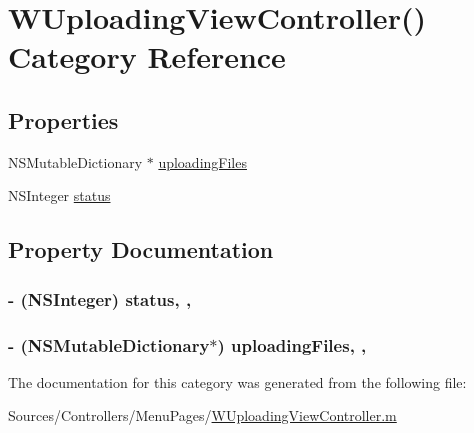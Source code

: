 \hypertarget{category_w_uploading_view_controller_07_08}{\section{W\-Uploading\-View\-Controller() Category Reference}
\label{category_w_uploading_view_controller_07_08}
}
\subsection*{Properties}
\begin{DoxyCompactItemize}
\item 
N\-S\-Mutable\-Dictionary $\ast$ \hyperlink{category_w_uploading_view_controller_07_08_ac9c484b6a4072bf3f8c3cc73b534c430}{uploading\-Files}
\item 
N\-S\-Integer \hyperlink{category_w_uploading_view_controller_07_08_aae6d30e8b6a594124c23822a93292b64}{status}
\end{DoxyCompactItemize}


\subsection{Property Documentation}
\hypertarget{category_w_uploading_view_controller_07_08_aae6d30e8b6a594124c23822a93292b64}{
\subsubsection[{status}]{\setlength{\rightskip}{0pt plus 5cm}-\/ (N\-S\-Integer) status\hspace{0.3cm}{\ttfamily [read]}, {\ttfamily [write]}, {\ttfamily [atomic]}}}\label{category_w_uploading_view_controller_07_08_aae6d30e8b6a594124c23822a93292b64}
\hypertarget{category_w_uploading_view_controller_07_08_ac9c484b6a4072bf3f8c3cc73b534c430}{
\subsubsection[{uploading\-Files}]{\setlength{\rightskip}{0pt plus 5cm}-\/ (N\-S\-Mutable\-Dictionary$\ast$) uploading\-Files\hspace{0.3cm}{\ttfamily [read]}, {\ttfamily [write]}, {\ttfamily [atomic]}}}\label{category_w_uploading_view_controller_07_08_ac9c484b6a4072bf3f8c3cc73b534c430}


The documentation for this category was generated from the following file\-:\begin{DoxyCompactItemize}
\item 
Sources/\-Controllers/\-Menu\-Pages/\hyperlink{_w_uploading_view_controller_8m}{W\-Uploading\-View\-Controller.\-m}\end{DoxyCompactItemize}
